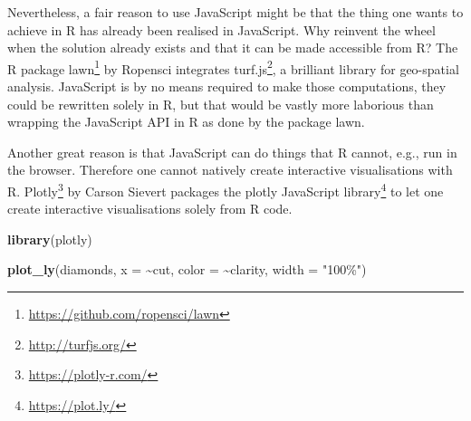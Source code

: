 \documentclass[
  10pt,
]{krantz}
\makeatletter
\newenvironment{Shaded}{\begin{snugshade}}{\end{snugshade}}
\newcommand{\CommentTok}[1]{\textcolor[rgb]{0.37,0.37,0.37}{\textit{#1}}}
\newcommand{\DataTypeTok}[1]{\textcolor[rgb]{0.27,0.27,0.27}{#1}}
\newcommand{\KeywordTok}[1]{\textcolor[rgb]{0.27,0.27,0.27}{\textbf{#1}}}
\newcommand{\NormalTok}[1]{#1}
\newcommand{\OperatorTok}[1]{\textcolor[rgb]{0.43,0.43,0.43}{\textbf{#1}}}
\newcommand{\StringTok}[1]{\textcolor[rgb]{0.5,0.5,0.5}{#1}}
\renewcommand{\href}[2]{#2\footnote{\url{#1}}}
\newenvironment{kframe}{%
\medskip{}
\setlength{\fboxsep}{.8em}
 \def\at@end@of@kframe{}%
 \ifinner\ifhmode%
  \def\at@end@of@kframe{\end{minipage}}%
  \begin{minipage}{\columnwidth}%
 \fi\fi%
 \def\FrameCommand##1{\hskip\@totalleftmargin \hskip-\fboxsep
 \colorbox{shadecolor}{##1}\hskip-\fboxsep
     \hskip-\linewidth \hskip-\@totalleftmargin \hskip\columnwidth}%
 \MakeFramed {\advance\hsize-\width
   \@totalleftmargin\z@ \linewidth\hsize
   \@setminipage}}%
 {\par\unskip\endMakeFramed%
 \at@end@of@kframe}
\renewenvironment{Shaded}{\begin{kframe}}{\end{kframe}}
\makeatother
\begin{document}
Nevertheless, a fair reason to use JavaScript might be that the thing one wants to achieve in R has already been realised in JavaScript. Why reinvent the wheel when the solution already exists and that it can be made accessible from R? The R package \href{https://github.com/ropensci/lawn}{lawn} \citep{R-lawn} by Ropensci integrates \href{http://turfjs.org/}{turf.js}, a brilliant library for geo-spatial analysis. JavaScript is by no means required to make those computations, they could be rewritten solely in R, but that would be vastly more laborious than wrapping the JavaScript API in R as done by the package lawn.

\begin{Shaded}
\end{Shaded}

Another great reason is that JavaScript can do things that R cannot, e.g., run in the browser. Therefore one cannot natively create interactive visualisations with R. \href{https://plotly-r.com/}{Plotly} \citep{R-plotly} by Carson Sievert packages the \href{https://plot.ly/}{plotly JavaScript library} to let one create interactive visualisations solely from R code.

\begin{Shaded}
\begin{Highlighting}[]
\KeywordTok{library}\NormalTok{(plotly)}

\KeywordTok{plot\_ly}\NormalTok{(diamonds, }\DataTypeTok{x =} \OperatorTok{\textasciitilde{}}\NormalTok{cut, }\DataTypeTok{color =} \OperatorTok{\textasciitilde{}}\NormalTok{clarity, }\DataTypeTok{width =} \StringTok{"100\%"}\NormalTok{)}
\end{Highlighting}
\end{Shaded}
\end{document}
